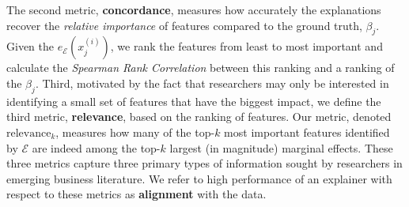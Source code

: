 \documentclass[12pt]{article}  %
\newcommand{\mE}{\mathcal{E}}
\begin{document}
  The second metric, \textbf{concordance}, measures how accurately the explanations recover the \textit{relative importance} of features compared to the ground truth, $\beta_j$. Given the $e_\mathcal{E}(x^{(i)}_j)$, we rank the features from least to most important and calculate the \emph{Spearman Rank Correlation} \cite{spearman1904proof} between this ranking and a ranking of the $\beta_j$.
  Third, motivated by the fact that researchers may only be interested in identifying a small set of features that have the biggest impact, we define the third metric, \textbf{relevance}, based on the ranking of features. Our metric, denoted $\text{relevance}_k$, measures how many of the top-$k$ most important features identified by $\mathcal{E}$ are indeed among the top-$k$ largest (in magnitude) marginal effects. These three metrics capture three primary types of information sought by researchers in emerging business literature. We refer to high performance of an explainer with respect to these metrics as \textbf{alignment} with the data.
  
\end{document}
